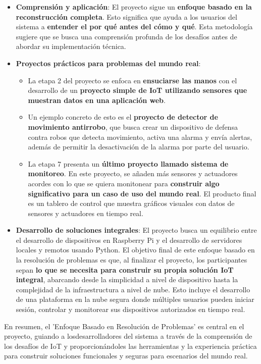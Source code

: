\documentclass{report}
\begin{document}
\begin{itemize}
    \item \textbf{Comprensión y aplicación}: El proyecto sigue un \textbf{enfoque basado en la reconstrucción completa}. Esto significa 
    que ayuda a los usuarios del sistema a \textbf{entender el por qué antes del cómo y qué}. Esta metodología sugiere que se busca 
    una comprensión profunda de los desafíos antes de abordar su implementación técnica.

    \item \textbf{Proyectos prácticos para problemas del mundo real}:
    \begin{itemize}
        \item La etapa 2 del proyecto se enfoca en \textbf{ensuciarse las manos} con el desarrollo de un \textbf{proyecto simple de IoT 
        utilizando sensores que muestran datos en una aplicación web}.
        \item Un ejemplo concreto de esto es el \textbf{proyecto de detector de movimiento antirrobo}, que busca crear un 
        dispositivo de defensa contra robos que detecta movimiento, activa una alarma y envía alertas, además de permitir la desactivación 
        de la alarma por parte del usuario.
        \item La etapa 7 presenta un \textbf{último proyecto llamado sistema de monitoreo}. En este proyecto, se añaden más sensores y 
        actuadores acordes con lo que se quiera monitonear para \textbf{construir algo significativo para un caso de uso del mundo real}. 
        El producto final es un tablero de control que muestra gráficos visuales con datos de sensores y actuadores en tiempo real.
    \end{itemize}

    \item \textbf{Desarrollo de soluciones integrales}: El proyecto busca un equilibrio entre el desarrollo de dispositivos en Raspberry Pi 
    y el desarrollo de servidores locales y remotos usando Python. El objetivo final de este enfoque basado en la resolución de problemas es 
    que, al finalizar el proyecto, los participantes sepan \textbf{lo que se necesita para construir su propia solución IoT integral}, 
    abarcando desde la simplicidad a nivel de dispositivo hasta la complejidad de la infraestructura a nivel de nube. Esto incluye el 
    desarrollo de una plataforma en la nube segura donde múltiples usuarios pueden iniciar sesión, controlar y monitorear sus dispositivos 
    autorizados en tiempo real.
\end{itemize}
En resumen, el 'Enfoque Basado en Resolución de Problemas' es central en el proyecto, guiando a losdesarrolladores del sistema a través 
de la comprensión de los desafíos de IoT y proporcionándoles las herramientas y la experiencia práctica para construir soluciones funcionales 
y seguras para escenarios del mundo real.
\end{document}
